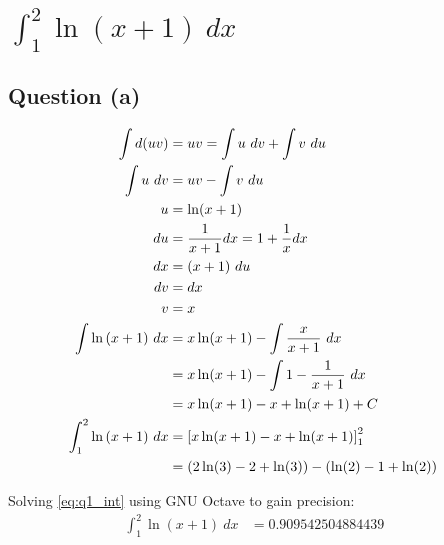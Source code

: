 \section{$\int_{1}^{2}\ln{(x+1)} \ dx$}
	\subsection{Question (a)}
		\begin{align}
			\int d(uv) &= uv = \int u \ dv + \int v \ du& \\
			\int u \ dv &= uv - \int v \ du& \\
			u &= \ln(x+1)& \\
			du &= \frac{1}{x+1} dx = 1 + \frac{1}{x} dx& \\
			dx &= (x+1) \ du& \\
			dv &= dx& \\
			v &= x& \\
			\int \ln{(x+1)} \ dx &= x\ln(x+1) - \int \frac{x}{x+1} \ dx& \notag \\
			&= x\ln(x+1) - \int 1 - \frac{1}{x+1} \ dx& \notag \\
			&= x\ln(x+1) - x + \ln(x+1) + C& \\
			\int_{1}^{2}\ln{(x+1)} \ dx &= \left[ x\ln(x+1) - x + \ln(x+1) \right]_{1}^{2} \notag \\
			&= (2\ln(3) - 2 + \ln(3)) - (\ln(2) - 1 + \ln(2)) \label{eq:q1_int}
		\end{align}

		Solving \cref{eq:q1_int} using GNU Octave to gain precision:
		\begin{align}
			\int_{1}^{2}\ln{(x+1)} \ dx &= 0.909542504884439& \label{eq:q1_exact}
		\end{align}

